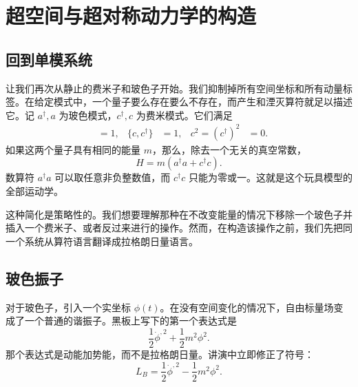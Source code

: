 \chapter{超空间与超对称动力学的构造}


\section{回到单模系统}

让我们再次从静止的费米子和玻色子开始。我们抑制掉所有空间坐标和所有动量标签。在给定模式中，一个量子要么存在要么不存在，而产生和湮灭算符就足以描述它。记 \(a^\dagger,a\) 为玻色模式，\(c^\dagger,c\) 为费米模式。它们满足
\begin{align}
[a,a^\dagger]&=1,
&
\{c,c^\dagger\}&=1,
&
c^2=(c^\dagger)^2&=0.
\end{align}
如果这两个量子具有相同的能量 \(m\)，那么，除去一个无关的真空常数，
\begin{equation}
H=m\left(a^\dagger a+c^\dagger c\right).
\label{eq:l7-one-mode-hamiltonian}
\end{equation}
数算符 \(a^\dagger a\) 可以取任意非负整数值，而 \(c^\dagger c\) 只能为零或一。这就是这个玩具模型的全部运动学。

这种简化是策略性的。我们想要理解那种在不改变能量的情况下移除一个玻色子并插入一个费米子、或者反过来进行的操作。然而，在构造该操作之前，我们先把同一个系统从算符语言翻译成拉格朗日量语言。

\section{玻色振子}

对于玻色子，引入一个实坐标 \(\phi(t)\)。在没有空间变化的情况下，自由标量场变成了一个普通的谐振子。黑板上写下的第一个表达式是
\[
\frac{1}{2}\dot\phi^{,2}+\frac{1}{2}m^2\phi^2.
\]
那个表达式是动能加势能，而不是拉格朗日量。讲演中立即修正了符号：
\begin{equation}
L_B=\frac{1}{2}\dot\phi^{,2}-\frac{1}{2}m^2\phi^2.
\label{eq:l7-boson-lagrangian}
\end{equation}


